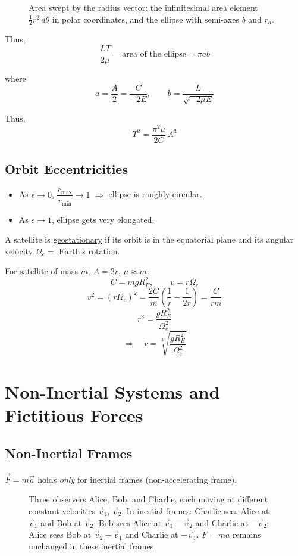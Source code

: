 \begin{figure}[H]
  \centering
  \caption{Area swept by the radius vector: the infinitesimal area element $\frac{1}{2}r^2\,d\theta$ in polar coordinates, and the ellipse with semi-axes $b$ and $r_a$.}
\end{figure}

Thus,
\[
  \frac{LT}{2\mu} = \text{area of the ellipse} = \pi ab
\]

where
\[
  a = \frac{A}{2} = \frac{C}{-2E}, \qquad b = \frac{L}{\sqrt{-2\mu E}}
\]

Thus,
\[
  T^2 = \frac{\pi^2\mu}{2C}\,A^3
\]

\section{Orbit Eccentricities}

\begin{itemize}
  \item As $\epsilon \to 0$, $\dfrac{r_\text{max}}{r_\text{min}} \to 1$ $\Rightarrow$ ellipse is roughly circular.
  \item As $\epsilon \to 1$, ellipse gets very elongated.
\end{itemize}

\begin{example}
A satellite is \underline{geostationary} if its orbit is in the equatorial plane and its angular velocity $\Omega_e = $ Earth's rotation.

For satellite of mass $m$, $A = 2r$, $\mu \approx m$:
\[
  C = mgR_E^2, \qquad v = r\Omega_e
\]
\[
  v^2 = (r\Omega_e)^2 = \frac{2C}{m}\!\left(\frac{1}{r} - \frac{1}{2r}\right) = \frac{C}{rm}
\]
\[
  r^3 = \frac{gR_E^2}{\Omega_e^2}
\]
\[
  \Rightarrow \quad r = \sqrt[3]{\frac{gR_E^2}{\Omega_e^2}}
\]
\end{example}

\chapter{Non-Inertial Systems and Fictitious Forces}

\section{Non-Inertial Frames}

$\vec{F} = m\vec{a}$ holds \emph{only} for inertial frames (non-accelerating frame).

\begin{figure}[H]
  \centering
  \caption{Three observers Alice, Bob, and Charlie, each moving at different constant velocities $\vec{v}_1$, $\vec{v}_2$. In inertial frames: Charlie sees Alice at $\vec{v}_1$ and Bob at $\vec{v}_2$; Bob sees Alice at $\vec{v}_1 - \vec{v}_2$ and Charlie at $-\vec{v}_2$; Alice sees Bob at $\vec{v}_2 - \vec{v}_1$ and Charlie at $-\vec{v}_1$. $F = ma$ remains unchanged in these inertial frames.}
\end{figure}

